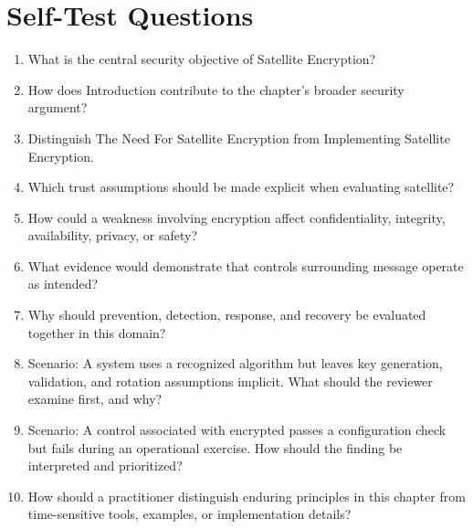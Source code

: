 \documentclass[11pt]{article}
\begin{document}
\section*{Self-Test Questions}
\begin{enumerate}
\item What is the central security objective of Satellite Encryption?
\item How does Introduction contribute to the chapter's broader security argument?
\item Distinguish The Need For Satellite Encryption from Implementing Satellite Encryption.
\item Which trust assumptions should be made explicit when evaluating satellite?
\item How could a weakness involving encryption affect confidentiality, integrity, availability, privacy, or safety?
\item What evidence would demonstrate that controls surrounding message operate as intended?
\item Why should prevention, detection, response, and recovery be evaluated together in this domain?
\item Scenario: A system uses a recognized algorithm but leaves key generation, validation, and rotation assumptions implicit. What should the reviewer examine first, and why?
\item Scenario: A control associated with encrypted passes a configuration check but fails during an operational exercise. How should the finding be interpreted and prioritized?
\item How should a practitioner distinguish enduring principles in this chapter from time-sensitive tools, examples, or implementation details?
\end{enumerate}
\end{document}
